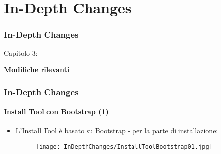 %

\section{In-Depth Changes}
\begin{frame}[fragile]
	\frametitle{In-Depth Changes}

	\begin{center}\huge{Capitolo 3:}\end{center}
	\begin{center}\huge{\color{typo3darkgrey}\textbf{Modifiche rilevanti}}\end{center}

\end{frame}


\begin{frame}[fragile]
	\frametitle{In-Depth Changes}
	\framesubtitle{Install Tool con Bootstrap (1)}

	\begin{itemize}

		\item L'Install Tool è basato su Bootstrap - per la parte di installazione:

			\begin{figure}
				\texttt{[image: InDepthChanges/InstallToolBootstrap01.jpg]}
			\end{figure}

	\end{itemize}

\end{frame}

